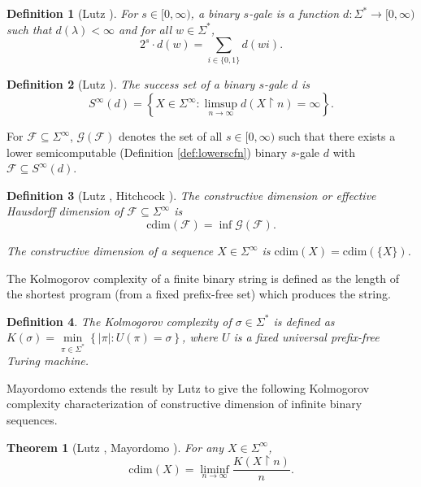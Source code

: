 \documentclass[11pt]{article}
\newtheorem{theorem}{Theorem}
\newtheorem{definition}{Definition}
\newcommand{\restr}{\upharpoonright}
\newcommand{\cdim}{\mathrm{cdim}}
\newcommand{\Rplus}{[0,\infty)}
\begin{document}
\begin{definition}[Lutz \cite{Lutz2003b}]
	For $s \in \Rplus$, a binary $s$-gale is a function $d: \Sigma^{*}
	\to \Rplus$ such that $d(\lambda) < \infty$ and for all $w \in
	\Sigma^*$, $$ 2^s \cdot d(w) = \sum_{i \in \{0,1\}} d(wi).$$
\end{definition}

\begin{definition}[Lutz \cite{Lutz2003b}]
The \emph{success set} of a binary $s$-gale $d$ is $$S^\infty (d) = \left\{ X \in
\Sigma^\infty : \limsup \limits_{n\to\infty} d(X \restr n) =
\infty\right\}.$$
\end{definition}



For $\mathcal{F} \subseteq \Sigma^\infty$, $\mathcal{G}(\mathcal{F})$
denotes the set of all $s \in \Rplus$ such that there exists a lower
semicomputable (Definition \ref{def:lowerscfn}) binary $s$-gale $d$ with $\mathcal{F} \subseteq S^\infty (d)$.

\begin{definition}	[Lutz \cite{Lutz2003b}, Hitchcock \cite{Hitchcock2003c}]
	The \emph{constructive dimension} or \emph{effective Hausdorff
		dimension} of $\mathcal{F} \subseteq \Sigma^\infty$ is $$\cdim(\mathcal{F}) =
	\inf \mathcal{G}(\mathcal{F}).$$ 
	
	The constructive dimension of a
	sequence $X \in \Sigma^\infty$ is $\cdim(X) = \cdim(\{X\})$.
\end{definition}

The Kolmogorov complexity of a finite binary string is defined as the length of the shortest program (from a fixed prefix-free set) which produces the string. 

\begin{definition}
	The	Kolmogorov complexity of $\sigma \in \Sigma^*$ is defined as $K(\sigma)= \min\limits_{\pi \in \Sigma^*} \left\{ \lvert \pi \rvert : U(\pi)=\sigma \right\}$,	
	where $U$ is a fixed universal prefix-free Turing machine.
\end{definition}

Mayordomo \cite{Mayordomo02} extends the result by Lutz \cite{Lutz03} to give the following 
Kolmogorov complexity characterization of constructive dimension of infinite binary sequences.

\begin{theorem}[Lutz \cite{Lutz03}, Mayordomo \cite{Mayordomo02}] \label{lem:KCCharnofCdim}
	For any $X \in \Sigma^\infty$, $$\cdim(X) =
	\liminf\limits_{n\to\infty} \frac{K(X \restr n)}{n}.$$
\end{theorem}
\end{document}
